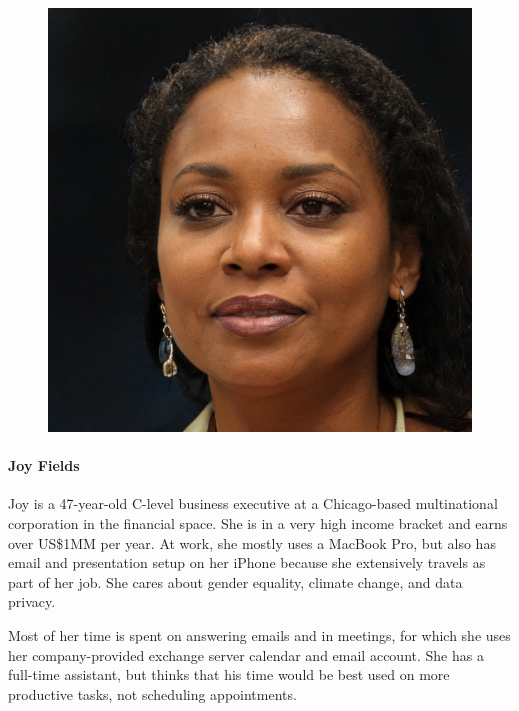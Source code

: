 \documentclass{article}
\begin{document}
\begin{figure}
	\includegraphics[scale=0.1]{persona-joy.jpg}
\end{figure}

\paragraph{Joy Fields}

Joy is a 47-year-old C-level business executive at a Chicago-based multinational corporation in the financial space. She is in a very high income bracket and earns over US\$1MM per year. At work, she mostly uses a MacBook Pro, but also has email and presentation setup on her iPhone because she extensively travels as part of her job. She cares about gender equality, climate change, and data privacy.

Most of her time is spent on answering emails and in meetings, for which she uses her company-provided exchange server calendar and email account. She has a full-time assistant, but thinks that his time would be best used on more productive tasks, not scheduling appointments.
\end{document}
